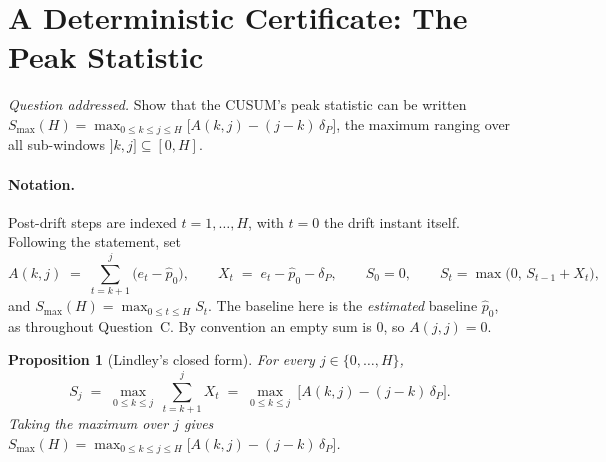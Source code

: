 \documentclass[10pt,a4paper]{article}
\newtheorem{proposition}{Proposition}
\begin{document}

\section{A Deterministic Certificate: The Peak Statistic}

\noindent\emph{Question addressed.} Show that the CUSUM's peak statistic can be
written $S_{\max}(H) = \max_{0 \le k \le j \le H}\bigl[A(k,j) - (j-k)\,\delta_P\bigr]$,
the maximum ranging over all sub-windows $]k,j] \subseteq [0,H]$.

\paragraph{Notation.} Post-drift steps are indexed $t = 1,\dots,H$, with $t=0$ the
drift instant itself. Following the statement, set
\[
  A(k,j) \;=\; \sum_{t=k+1}^{j} \bigl(e_t - \hat p_0\bigr),
  \qquad
  X_t \;=\; e_t - \hat p_0 - \delta_P,
  \qquad
  S_0 = 0,
  \qquad
  S_t = \max\bigl(0,\, S_{t-1} + X_t\bigr),
\]
and $S_{\max}(H) = \max_{0 \le t \le H} S_t$. The baseline here is the \emph{estimated}
baseline $\hat p_0$, as throughout Question~C. By convention an empty sum is $0$, so
$A(j,j) = 0$.

\begin{proposition}[Lindley's closed form]\label{prop:lindley}
For every $j \in \{0,\dots,H\}$,
\begin{equation}
  S_j \;=\; \max_{0 \le k \le j}\ \sum_{t=k+1}^{j} X_t
  \;=\; \max_{0 \le k \le j}\ \bigl[A(k,j) - (j-k)\,\delta_P\bigr].
  \label{eq:lindley}
\end{equation}
Taking the maximum over $j$ gives
$S_{\max}(H) = \max_{0 \le k \le j \le H}\bigl[A(k,j) - (j-k)\,\delta_P\bigr]$.
\end{proposition}
\end{document}
